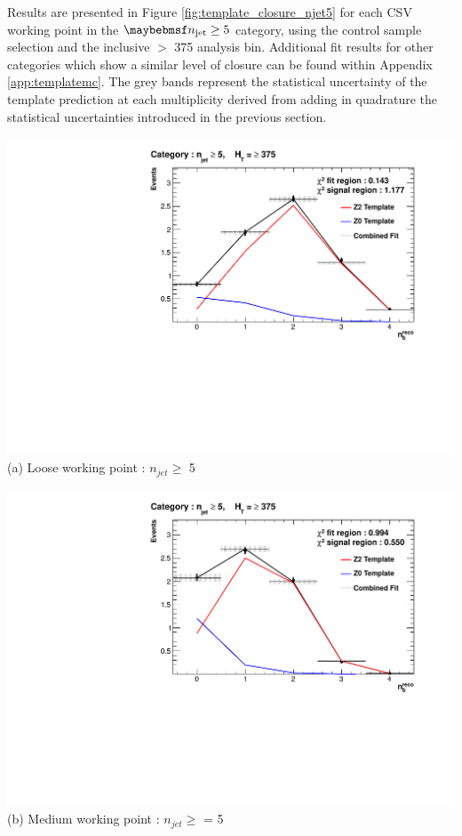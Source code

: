 Results are presented in Figure \ref{fig:template_closure_njet5} for each \ac{CSV} working point in the $\njet \geq 5$ category, using the \mupjets control sample selection and the inclusive \theht$>$ 375 \GeV analysis bin. Additional fit results for other \njet categories which show a similar level of closure can be found within Appendix \ref{app:templatemc}.  The grey bands represent the statistical uncertainty of the template prediction at each \nbreco multiplicity derived from adding in quadrature the statistical uncertainties introduced in the previous section.

\begin{minipage}{1.0\textwidth}
\footnotesize
\vspace{5mm}
\centering
\begin{minipage}{.51\textwidth}
\centering
\includegraphics[width = 1.0\linewidth]{plots/ThesisPlots/Final_Fit_To_MC_Normal_Loose_HTBin_OneMuon_Template_375_jet_mult_5.pdf}
\centering (a) Loose working point : $n_{jet} \geq$  5 
\end{minipage}
\quad
\begin{minipage}[b]{0.51\linewidth}
\includegraphics[width = 1.0\linewidth]{plots/ThesisPlots/Final_Fit_To_MC_Normal_Medium_HTBin_OneMuon_Template_375_jet_mult_5.pdf}
\centering (b) Medium working point : $n_{jet} \geq$ = 5 
\end{minipage}
\end{minipage}

